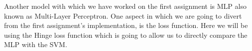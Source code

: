 Another model with which we have worked on the first assignment is MLP also known as 
Multi-Layer Perceptron. One aspect in which we are going to divert from the first 
assignment's implementation, is the loss function. Here we will be using the Hinge loss 
function which is going to allow us to directly compare the MLP with the SVM.
    